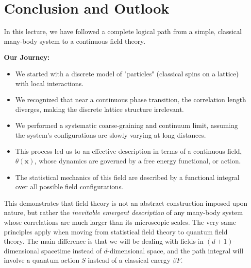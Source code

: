 \documentclass[11pt, a4paper, article]{article}
\renewcommand{\vec}[1]{\bm{#1}} %
\begin{document}
\section{Conclusion and Outlook}

In this lecture, we have followed a complete logical path from a simple, classical many-body system to a continuous field theory.

\textbf{Our Journey:}
\begin{itemize}
    \item We started with a discrete model of "particles" (classical spins on a lattice) with local interactions.
    \item We recognized that near a continuous phase transition, the correlation length diverges, making the discrete lattice structure irrelevant.
    \item We performed a systematic coarse-graining and continuum limit, assuming the system's configurations are slowly varying at long distances.
    \item This process led us to an effective description in terms of a continuous field, $\theta(\vec{x})$, whose dynamics are governed by a free energy functional, or action.
    \item The statistical mechanics of this field are described by a functional integral over all possible field configurations.
\end{itemize}

This demonstrates that field theory is not an abstract construction imposed upon nature, but rather the \textit{inevitable emergent description} of any many-body system whose correlations are much larger than its microscopic scales. The very same principles apply when moving from statistical field theory to quantum field theory. The main difference is that we will be dealing with fields in $(d+1)$-dimensional spacetime instead of $d$-dimensional space, and the path integral will involve a quantum action $S$ instead of a classical energy $\beta F$.
\end{document}

